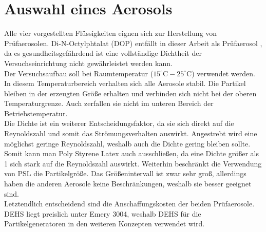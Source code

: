 \section{Auswahl eines Aerosols}
Alle vier vorgestellten Fl\"{u}ssigkeiten eignen sich zur Herstellung von Pr\"{u}faerosolen. Di-N-Octylphtalat (DOP) entf\"{a}llt in dieser Arbeit als Pr\"{u}faerosol , da es gesundheitsgef\"{a}hrdend ist eine vollst\"{a}ndige Dichtheit der Versuchseinrichtung nicht gew\"{a}hrleistet werden kann.\\
Der Versuchsaufbau soll bei Raumtemperatur (\(15^\circ\text{C} - 25^\circ\text{C}\)) verwendet werden. In diesem Temperaturbereich verhalten sich alle Aerosole stabil. Die Partikel bleiben in der erzeugten Gr\"{o}{\ss}e erhalten und verbinden sich nicht bei der oberen Temperaturgrenze. Auch zerfallen sie nicht im unteren Bereich der Betriebstemperatur.\\
Die Dichte ist ein weiterer Entscheidungsfaktor, da sie sich direkt auf die Reynoldszahl und somit das Str\"{o}mungsverhalten auswirkt. Angestrebt wird eine m\"{o}glichst geringe Reynoldszahl, weshalb auch die Dichte gering bleiben sollte. Somit kann man Poly Styrene Latex auch ausschlie{\ss}en, da eine Dichte gr\"{o}{\ss}er als 1 sich stark auf die Reynoldszahl auswirkt. Weiterhin beschr\"{a}nkt die Verwendung von PSL die Partikelgr\"{o}{\ss}e. Das Gr\"{o}{\ss}enintervall ist zwar sehr gro{\ss}, allerdings haben die anderen Aerosole keine Beschr\"{a}nkungen, weshalb sie besser geeignet sind.\\
Letztendlich entscheidend sind die Anschaffungskosten der beiden Pr\"{u}faerosole. DEHS liegt preislich unter Emery 3004, weshalb DEHS f\"{u}r die Partikelgeneratoren in den weiteren Konzepten verwendet wird.